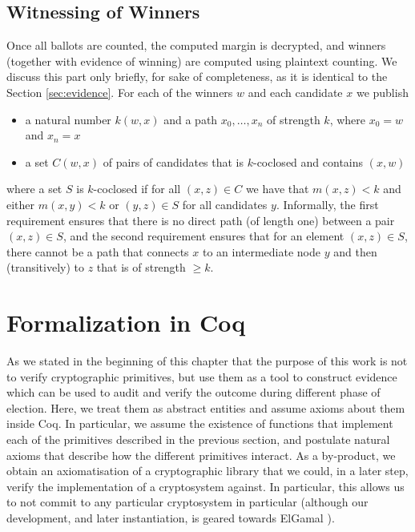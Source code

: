 \subsection{Witnessing of Winners}
Once all ballots are counted, the computed margin is decrypted, and
winners (together with evidence of winning) are computed using 
plaintext counting. We discuss this part only briefly, for sake of completeness,
 as it is identical to the Section \ref{sec:evidence}.
 For each of the winners $w$ and each
candidate $x$ we publish
\begin{itemize}
\item a natural number $k(w, x)$ and a path $x_0, \dots, x_n $ of strength $k$, where $x_0 = w$ 
and $x_n = x$
\item a set $C(w, x)$ of pairs of candidates that is $k$-coclosed
and contains $(x, w)$
\end{itemize}
where a set $S$ is  $k$-coclosed if for all $(x,z) \in C$ we have
that $m(x, z) < k$ and either $m(x, y) < k$ or $(y,z) \in S$ for
all candidates $y$.  Informally, the first requirement ensures that
there is no direct path (of length one) between a pair $(x, z) \in
S$, and the second requirement ensures that for an element $(x, z)
\in S$, there cannot be a path that connects $x$ to an intermediate
node $y$ and then (transitively) to $z$ that is of strength $\geq
k$.


\section{Formalization in Coq} \label{sec:realisation}



As we stated in the beginning of this chapter that the purpose of this work is
not to verify cryptographic primitives, 
but use them as a tool to construct evidence which can be used 
to audit and verify the outcome during different phase 
of election. Here, we treat them as abstract entities and assume
axioms about them inside Coq.
In particular, we assume the existence of functions that implement
each of the primitives described in the previous section, and
postulate natural axioms that describe how the different primitives
interact. As a by-product, we obtain an axiomatisation of a
cryptographic library that we could, in a later step, verify the
implementation of a cryptosystem against.  In particular, this
allows us to not commit to any particular cryptosystem in particular
(although our development, and later instantiation, is geared
towards ElGamal \citep{elgamal1985public}).

